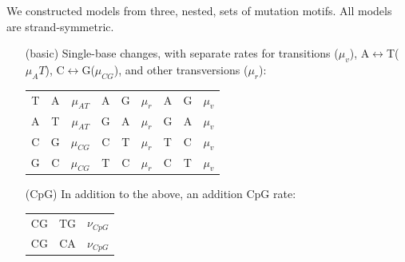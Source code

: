 \documentclass{article}
\newcommand{\nA}{\mbox{A}}  %
\newcommand{\nC}{\mbox{C}}
\newcommand{\nG}{\mbox{G}}
\newcommand{\nT}{\mbox{T}}
\theoremstyle{plain}
\theoremstyle{definition}
\begin{document}
We constructed models from three, nested, sets of mutation motifs.
All models are strand-symmetric.
\begin{itemize}
    \item[(basic)] 
        Single-base changes, with separate rates for transitions ($\mu_v$),
        \nA$\leftrightarrow$\nT ($\mu_{A}T$), \nC$\leftrightarrow$\nG ($\mu_{CG}$),
        and other transversions ($\mu_{r}$):
          \begin{center}
            \begin{tabular}{c@{\quad$\to$\quad}c@{\quad at rate\quad }c|c@{\quad$\to$\quad}c@{\quad at rate\quad }c|c@{\quad$\to$\quad}c@{\quad at rate\quad }c}
                \nT  &   \nA   &  $\mu_{AT}$ & \nA  &   \nG   &  $\mu_{r}$ & \nA  &   \nG   &  $\mu_{v}$ \\
                \nA  &   \nT   &  $\mu_{AT}$ & \nG  &   \nA   &  $\mu_{r}$ & \nG  &   \nA   &  $\mu_{v}$ \\
                \nC  &   \nG   &  $\mu_{CG}$ & \nC  &   \nT   &  $\mu_{r}$ & \nT  &   \nC   &  $\mu_{v}$ \\
                \nG  &   \nC   &  $\mu_{CG}$ & \nT  &   \nC   &  $\mu_{r}$ & \nC  &   \nT   &  $\mu_{v}$ \\
            \end{tabular}
          \end{center}

      \item[(CpG)] In addition to the above, an addition CpG rate:
          \begin{center}
            \begin{tabular}{c@{\quad$\to$\quad}c@{\quad at rate\quad }c}
                CG  &   TG   &  $\nu_{CpG}$ \\
                CG  &   CA   &  $\nu_{CpG}$ \\
            \end{tabular}
          \end{center}


\end{itemize}
\end{document}
